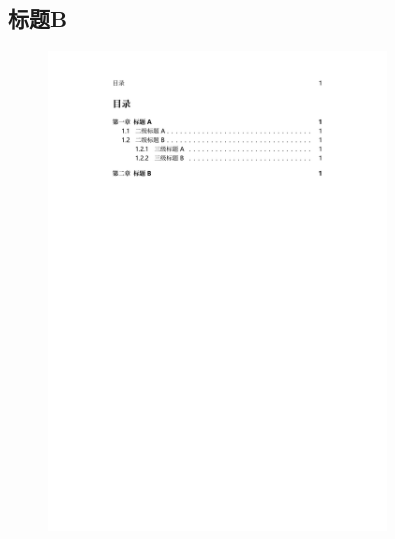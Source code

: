 \begin{texsepcode}
\begin{texcodenoshad}
            \section{标题B}
        \end{texcodenoshad}
        \tcblower
        \begin{figure}[H]
            \centering
            \includegraphics[page=2,clip,trim =0 {0.5\paperheight} 0 {0.1\paperheight},width=0.8\textwidth]{fig/section-tmp.pdf}
        \end{figure}
    \end{texsepcode}

